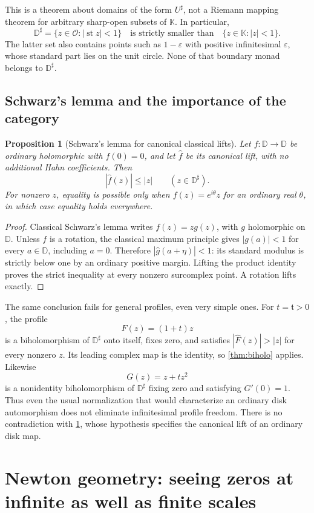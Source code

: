 \documentclass[11pt,a4paper]{article}
\numberwithin{equation}{section}
\newtheorem{proposition}[theorem]{Proposition}
\theoremstyle{definition}
\newcommand{\K}{\mathbb K}
\newcommand{\tmon}{\mathfrak t}
\newcommand{\OO}{\mathcal O}
\newcommand{\st}{\operatorname{st}}
\newcommand{\hhat}[1]{\widehat{#1}}
\newcommand{\D}{\mathbb D}
\begin{document}
This is a theorem about domains of the form $U^\sharp$, not a Riemann mapping
theorem for arbitrary sharp-open subsets of $\K$. In particular,
\[
 \D^\sharp=\{z\in\OO:|\st z|<1\}
 \quad\text{is strictly smaller than}\quad\{z\in\K:|z|<1\}.
\]
The latter set also contains points such as $1-\varepsilon$ with positive
infinitesimal $\varepsilon$, whose standard part lies on the unit circle.
None of that boundary monad belongs to $\D^\sharp$.

\subsection{Schwarz's lemma and the importance of the category}

\begin{proposition}[Schwarz's lemma for canonical classical lifts]
\label{prop:schwarz}
Let $f:\D\to\D$ be ordinary holomorphic with $f(0)=0$, and let $\hhat f$
be its canonical lift, with no additional Hahn coefficients. Then
\[
 |\hhat f(z)|\leq|z|\qquad(z\in\D^\sharp).
\]
For nonzero $z$, equality is possible only when $f(z)=e^{i\theta}z$ for an
ordinary real $\theta$, in which case equality holds everywhere.
\end{proposition}
\begin{proof}
Classical Schwarz's lemma writes $f(z)=zg(z)$, with $g$ holomorphic on $\D$.
Unless $f$ is a rotation, the classical maximum principle gives $|g(a)|<1$
for every $a\in\D$, including $a=0$. Therefore
$|\hhat g(a+\eta)|<1$: its standard modulus is strictly below one by an
ordinary positive margin. Lifting the product identity proves the strict
inequality at every nonzero surcomplex point. A rotation lifts exactly.
\end{proof}

The same conclusion fails for general profiles, even very simple ones.
For $t=\tmon>0$, the profile
\[
 F(z)=(1+t)z
\]
is a biholomorphism of $\D^\sharp$ onto itself, fixes zero, and satisfies
$|\hhat F(z)|>|z|$ for every nonzero $z$. Its leading complex map is the
identity, so \cref{thm:biholo} applies. Likewise
\[
 G(z)=z+t z^2
\]
is a nonidentity biholomorphism of $\D^\sharp$ fixing zero and satisfying
$G'(0)=1$. Thus even the usual normalization that would characterize an
ordinary disk automorphism does not eliminate infinitesimal profile
freedom. There is no contradiction with \cref{prop:schwarz}, whose hypothesis
specifies the canonical lift of an ordinary disk map.

\section{Newton geometry: seeing zeros at infinite as well as finite scales}
\end{document}
